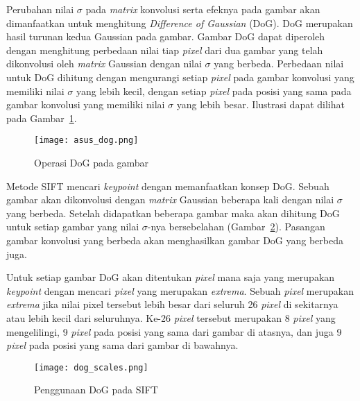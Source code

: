 Perubahan nilai $\sigma$ pada \textit{matrix} konvolusi serta efeknya pada gambar akan dimanfaatkan untuk menghitung \textit{Difference of Gaussian} (DoG). DoG merupakan hasil turunan kedua Gaussian pada gambar. Gambar DoG dapat diperoleh dengan menghitung perbedaan nilai tiap \textit{pixel} dari dua gambar yang telah dikonvolusi oleh \textit{matrix} Gaussian dengan nilai $\sigma$ yang berbeda. Perbedaan nilai untuk DoG dihitung dengan mengurangi setiap \textit{pixel} pada gambar konvolusi yang memiliki nilai $\sigma$ yang lebih kecil, dengan setiap \textit{pixel} pada posisi yang sama pada gambar konvolusi yang memiliki nilai $\sigma$ yang lebih besar. Ilustrasi dapat dilihat pada Gambar~\ref{fig:dog_asus}. 
\begin{figure}[H]
	\centering
	\texttt{[image: asus\_dog.png]}
	\caption{Operasi DoG pada gambar}
	\label{fig:dog_asus}
\end{figure} 

Metode SIFT mencari \textit{keypoint} dengan memanfaatkan konsep DoG. Sebuah gambar akan dikonvolusi dengan \textit{matrix} Gaussian beberapa kali dengan nilai $\sigma$ yang berbeda. Setelah didapatkan beberapa gambar maka akan dihitung DoG untuk setiap gambar yang nilai $\sigma$-nya bersebelahan (Gambar~\ref{fig:dog_scales}). Pasangan gambar konvolusi yang berbeda akan menghasilkan gambar DoG yang berbeda juga.  

Untuk setiap gambar DoG akan ditentukan \textit{pixel} mana saja yang merupakan \textit{keypoint} dengan mencari \textit{pixel} yang merupakan \textit{extrema}. Sebuah \textit{pixel} merupakan \textit{extrema} jika nilai pixel tersebut lebih besar dari seluruh 26 \textit{pixel} di sekitarnya atau lebih kecil dari seluruhnya. Ke-26 \textit{pixel} tersebut merupakan 8 \textit{pixel} yang mengelilingi, 9 \textit{pixel} pada posisi yang sama dari gambar di atasnya, dan juga 9 \textit{pixel} pada posisi yang sama dari gambar di bawahnya.
\begin{figure}[H]
	\centering
	\texttt{[image: dog\_scales.png]}
	\caption{Penggunaan DoG pada SIFT}
	\label{fig:dog_scales}
\end{figure} 

